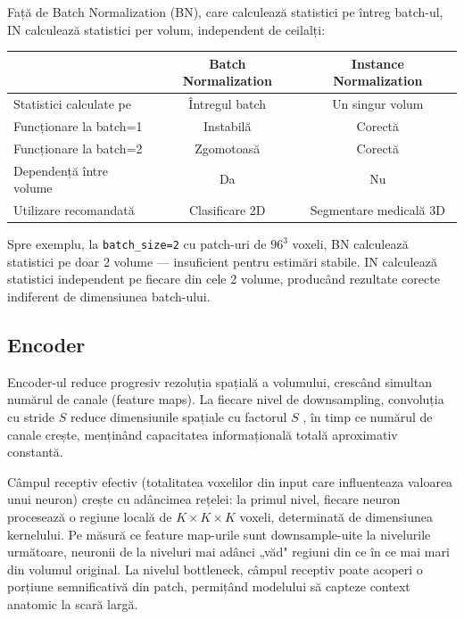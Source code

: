 \documentclass[12pt, a4paper]{report}
\begin{document}
Față de Batch Normalization (BN), care calculează statistici pe
întreg batch-ul, IN calculează statistici per volum, independent
de ceilalți:

\begin{center}
\begin{tabular}{lcc}
    \toprule
    & \textbf{Batch Normalization} & \textbf{Instance Normalization} \\
    \midrule
    Statistici calculate pe & Întregul batch  & Un singur volum \\
    Funcționare la batch=1  & Instabilă       & Corectă \\
    Funcționare la batch=2  & Zgomotoasă      & Corectă \\
    Dependență între volume & Da              & Nu \\
    Utilizare recomandată   & Clasificare 2D  & Segmentare medicală 3D \\
    \bottomrule
\end{tabular}
\end{center}

Spre exemplu, la \texttt{batch\_size=2} cu patch-uri de $96^3$
voxeli, BN calculează statistici pe doar 2 volume — insuficient
pentru estimări stabile. IN calculează statistici independent
pe fiecare din cele 2 volume, producând rezultate corecte
indiferent de dimensiunea batch-ului.

\subsection{Encoder}

Encoder-ul reduce progresiv rezoluția spațială a volumului,
crescând simultan numărul de canale (feature maps). La fiecare
nivel de downsampling, convoluția cu stride $S$ reduce 
dimensiunile spațiale cu factorul $S$  , în timp ce numărul de canale crește,
menținând capacitatea informațională totală aproximativ constantă.

Câmpul receptiv efectiv  (totalitatea voxelilor din input care influenteaza valoarea unui neuron)  crește cu adâncimea rețelei: la primul
nivel, fiecare neuron procesează o regiune locală de
$K \times K \times K$ voxeli, determinată de dimensiunea
kernelului. Pe măsură ce feature map-urile sunt downsample-uite
la nivelurile următoare, neuronii de la niveluri mai adânci
„văd" regiuni din ce în ce mai mari din volumul original.
La nivelul bottleneck, câmpul receptiv poate acoperi o porțiune
semnificativă din patch, permițând modelului să capteze context
anatomic la scară largă.
\end{document}
